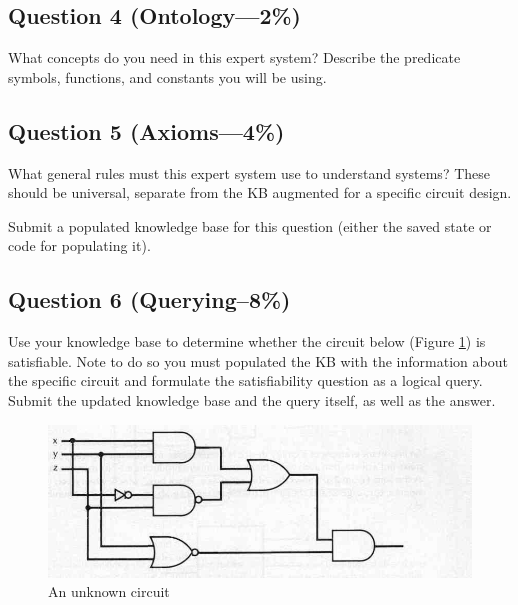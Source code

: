 \documentclass[12pt]{article}
\begin{document}
\subsection*{Question 4 \rm(Ontology---2\%)}
What concepts do you need in this expert system? Describe the predicate symbols, functions, and constants you will be using. 

\subsection*{Question 5 \rm(Axioms---4\%)}
What general rules must this expert system use to understand systems? These should be universal, separate from the KB augmented for a specific circuit design.

Submit a populated knowledge base for this question (either the saved state or code for populating it).

\subsection*{Question 6 \rm(Querying--8\%)}
Use your knowledge base to determine whether the circuit below (Figure \ref{fig:sat}) is satisfiable. Note to do so you must populated the KB with the information about the specific circuit and formulate the satisfiability question as a logical query. Submit the updated knowledge base and the query itself, as well as the answer.

\begin{figure}[bt]
\caption{An unknown circuit}
\label{fig:sat}
\centering
\includegraphics[width=.8\textwidth]{circuit2.jpg}
\end{figure}
\end{document}

